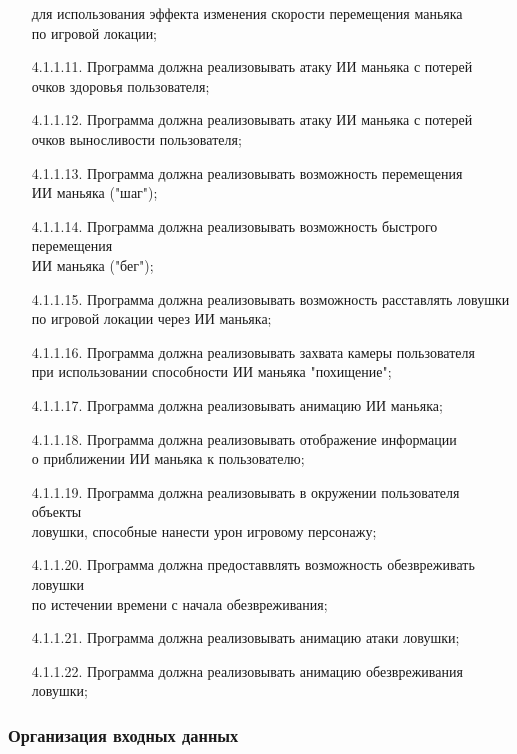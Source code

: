 \begin{enumerate}
    для использования эффекта изменения скорости перемещения маньяка \\по игровой локации;
    \item[4.1.1.11.] Программа должна реализовывать атаку ИИ маньяка с потерей\\
    очков здоровья пользователя;
    \item[4.1.1.12.] Программа должна реализовывать атаку ИИ маньяка с потерей\\ 
    очков выносливости пользователя;
    \item[4.1.1.13.] Программа должна реализовывать возможность перемещения\\
    ИИ маньяка ("шаг");
    \item[4.1.1.14.] Программа должна реализовывать возможность быстрого перемещения\\
    ИИ маньяка ("бег");
    \item[4.1.1.15.] Программа должна реализовывать возможность расставлять ловушки\\
    по игровой локации через ИИ маньяка;
    \item[4.1.1.16.] Программа должна реализовывать захвата камеры пользователя\\
    при использовании способности ИИ маньяка "похищение";
    \item[4.1.1.17.] Программа должна реализовывать анимацию ИИ маньяка;
    \item[4.1.1.18.] Программа должна реализовывать отображение информации\\
    о приближении ИИ маньяка к пользователю;
    \item[4.1.1.19.] Программа должна реализовывать в окружении пользователя объекты\\
    ловушки, способные нанести урон игровому персонажу;
    \item[4.1.1.20.] Программа должна предоставвлять возможность обезвреживать ловушки\\
    по истечении времени с начала обезвреживания;
    \item[4.1.1.21.] Программа должна реализовывать анимацию атаки ловушки;
    \item[4.1.1.22.] Программа должна реализовывать анимацию обезвреживания ловушки;
\end{enumerate}

\subsubsection{Организация входных данных}

